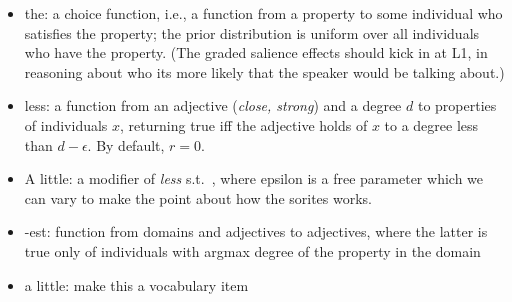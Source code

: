 \documentclass[12pt]{article}
\begin{document}
\begin{itemize}
\item the: a choice function, i.e., a function from a property to some individual who satisfies the property; the prior distribution is uniform over all individuals who have the property. (The graded salience effects should kick in at L1, in reasoning about who its more likely that the speaker would be talking about.)
\item less: a function from an adjective (\emph{close, strong}) and a degree $d$ to properties of individuals $x$, returning true iff the adjective holds of $x$ to a degree less than $d - \epsilon$. By default, $r = 0$. 
\item A little: a modifier of \emph{less} s.t.\ , where epsilon is a free parameter which we can vary to make the point about how the sorites works.
\item -est: function from domains and adjectives to adjectives, where the latter is true only of individuals with argmax degree of the property in the domain
\item a little: make this a vocabulary item  
\end{itemize} 
\end{document}
